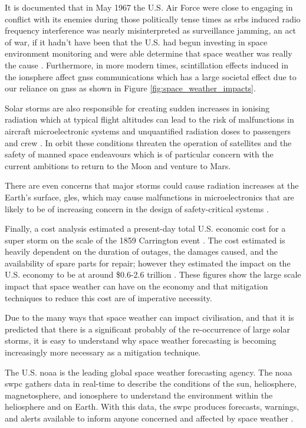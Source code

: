 It is documented that in May 1967 the U.S. Air Force were close to engaging in conflict with its enemies during those politically tense times as \glspl{srb} induced radio frequency interference was nearly misinterpreted as surveillance jamming, an act of war, if it hadn't have been that the U.S. had begun investing in space environment monitoring and were able determine that space weather was really the cause \citep{knipp_may_2016}. Furthermore, in more modern times, scintillation effects induced in the ionsphere affect \gls{gnss} communications which has a large societal effect due to our reliance on \gls{gnss} \citep{cannon_extreme_2013} as shown in Figure \ref{fig:space_weather_impacts}.

Solar storms are also responsible for creating sudden increases in ionising radiation which at typical flight altitudes can lead to the risk of malfunctions in aircraft microelectronic systems and unquantified radiation doses to passengers and crew \citep{cannon_extreme_2013}. In orbit these conditions threaten the operation of satellites and the safety of manned space endeavours which is of particular concern with the current ambitions to return to the Moon and venture to Mars. 

There are even concerns that major storms could cause radiation increases at the Earth's surface, \glspl{gle}, which may cause malfunctions in microelectronics that are likely to be of increasing concern in the design of safety-critical systems \citep{cannon_extreme_2013}. 

Finally, a cost analysis estimated a present-day total U.S. economic cost for a super storm on the scale of the 1859 Carrington event \citep{homeier_solar_2013}. The cost estimated is heavily dependent on the duration of outages, the damages caused, and the availability of spare parts for repair; however they estimated the impact on the U.S. economy to be at around \$0.6-2.6 trillion \citep{homeier_solar_2013}. These figures show the large scale impact that space weather can have on the economy and that mitigation techniques to reduce this cost are of imperative necessity.

Due to the many ways that space weather can impact civilisation, and that it is predicted that there is a significant probably of the re-occurrence of large solar storms, it is easy to understand why space weather forecasting is becoming increasingly more necessary as a mitigation technique. 

The U.S. \gls{noaa} is the leading global space weather forecasting agency. The \gls{noaa} \gls{swpc} gathers data in real-time to describe the conditions of the sun, heliosphere, magnetosphere, and ionosphere to understand the environment within the heliosphere and on Earth. With this data, the \gls{swpc} produces forecasts, warnings, and alerts available to inform anyone concerned and affected by space weather \citep{noaa_noaa_2018}. 

